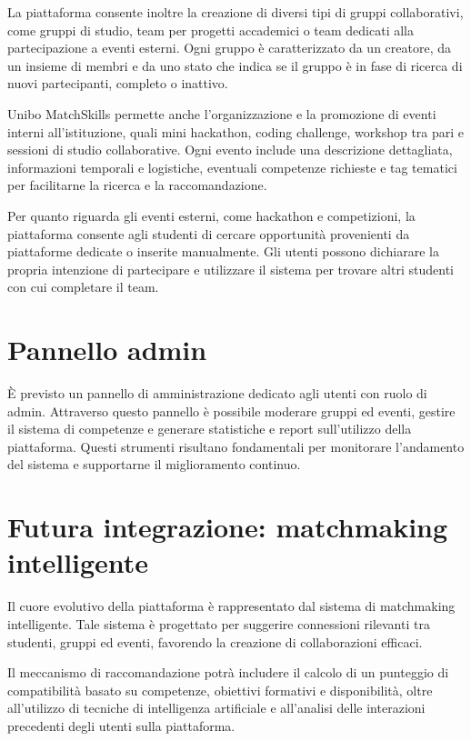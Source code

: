 \documentclass[a4paper,12pt]{article}
\begin{document}
La piattaforma consente inoltre la creazione di diversi tipi di gruppi collaborativi, come gruppi di studio, team per progetti accademici o team dedicati alla partecipazione a eventi esterni. Ogni gruppo è caratterizzato da un creatore, da un insieme di membri e da uno stato che indica se il gruppo è in fase di ricerca di nuovi partecipanti, completo o inattivo.

Unibo MatchSkills permette anche l’organizzazione e la promozione di eventi interni all’istituzione, quali mini hackathon, coding challenge, workshop tra pari e sessioni di studio collaborative. Ogni evento include una descrizione dettagliata, informazioni temporali e logistiche, eventuali competenze richieste e tag tematici per facilitarne la ricerca e la raccomandazione.

Per quanto riguarda gli eventi esterni, come hackathon e competizioni, la piattaforma consente agli studenti di cercare opportunità provenienti da piattaforme dedicate o inserite manualmente. Gli utenti possono dichiarare la propria intenzione di partecipare e utilizzare il sistema per trovare altri studenti con cui completare il team.

\section{Pannello admin}

È previsto un pannello di amministrazione dedicato agli utenti con ruolo di admin. Attraverso questo pannello è possibile moderare gruppi ed eventi, gestire il sistema di competenze e generare statistiche e report sull’utilizzo della piattaforma. Questi strumenti risultano fondamentali per monitorare l’andamento del sistema e supportarne il miglioramento continuo.

\section{Futura integrazione: matchmaking intelligente}

Il cuore evolutivo della piattaforma è rappresentato dal sistema di matchmaking intelligente. Tale sistema è progettato per suggerire connessioni rilevanti tra studenti, gruppi ed eventi, favorendo la creazione di collaborazioni efficaci.

Il meccanismo di raccomandazione potrà includere il calcolo di un punteggio di compatibilità basato su competenze, obiettivi formativi e disponibilità, oltre all’utilizzo di tecniche di intelligenza artificiale e all’analisi delle interazioni precedenti degli utenti sulla piattaforma.
\end{document}
